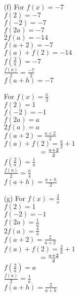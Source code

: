 \begin{enumialphparenastyle}
\begin{multicols}{2}
\begin{ex}
\begin{sol}
\vspace{3mm} 
	
(f) \hspace{2mm}  For $f(x) = -7$\\
$f(2) = -7$\\
$f(-2) = -7$\\
$f(2a) = -7$\\
$2 f(a) = -14$\\
$f(a+2) = -7$\\
$f(a) + f(2) = -14$\\
$f \left( \frac{2}{a} \right) = -7$ \\
$\frac{f(a)}{2} = \frac{-7}{2}$\\
$f(a + h) = -7$\\

\vspace{3mm}

For $f(x) = \frac{x}{2}$\\
$f(2) = 1$\\
$f(-2) = -1$\\
$f(2a) = a$\\
$2 f(a) = a$\\
$f(a+2) = \frac{a+2}{2}$\\
$f(a) + f(2) = \frac{a}{2}+ 1$ \\
$\hphantom{f(a) + f(2)} = \frac{a+2}{2}$\\
$f \left( \frac{2}{a} \right) = \frac{1}{a}$\\
$\frac{f(a)}{2} =  \frac{a}{4}$\\
$f(a + h) = \frac{a+h}{2}$\\
		
\vspace{3mm}	

(g) For $f(x) = \frac{2}{x}$\\
$f(2) = 1$\\
$f(-2) = -1$\\
$f(2a) = \frac{1}{a}$\\
$2 f(a) = \frac{4}{a}$\\
$f(a+2) = \frac{2}{a+2}$\\
$f(a) + f(2) = \frac{2}{a}+1$ \\
$\hphantom{f(a)+f(2)}=\frac{a+2}{2}$\\
$f \left( \frac{2}{a} \right) = a$\\
$\frac{f(a)}{2} =  \frac{1}{a}$\\
$f(a + h) = \frac{2}{a+h}$\\

\end{sol}
\end{ex}






\end{multicols}
\end{enumialphparenastyle}
